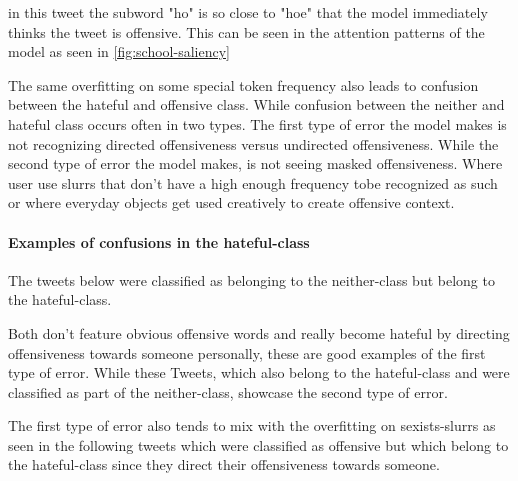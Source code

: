 \documentclass[11pt,a4paper]{article}
\begin{document}
in this tweet the subword "ho" is so close to "hoe" that the model immediately thinks the tweet is offensive.
This can be seen in the attention patterns of the model as seen in \ref{fig:school-saliency}

The same overfitting on some special token frequency also leads to confusion between the hateful and offensive class.
While confusion between the neither and hateful class occurs often in two types.
The first type of error the model makes is not recognizing directed offensiveness versus undirected offensiveness.
While the second type of error the model makes, is not seeing masked offensiveness.
Where user use slurrs that don't have a high enough frequency tobe recognized as such 
or where everyday objects get used creatively to create offensive context.

\paragraph{Examples of confusions in the hateful-class}
The tweets below were classified as belonging to the neither-class but belong to the hateful-class.

\begin{center}
  \newline
  \newline
\end{center}

Both don't feature obvious offensive words and really become hateful by directing offensiveness towards someone personally, 
these are good examples of the first type of error.
While these Tweets, which also belong to the hateful-class and were classified as part of the neither-class, showcase the second type of error.
\begin{center}
  \newline
   \newline
   \newline
\end{center}

The first type of error also tends to mix with the overfitting on sexists-slurrs as seen in the following tweets which were classified as offensive
but which belong to the hateful-class since they direct their offensiveness towards someone.
\begin{center}
  \newline
  \newline
  \newline
\end{center}
\end{document}
